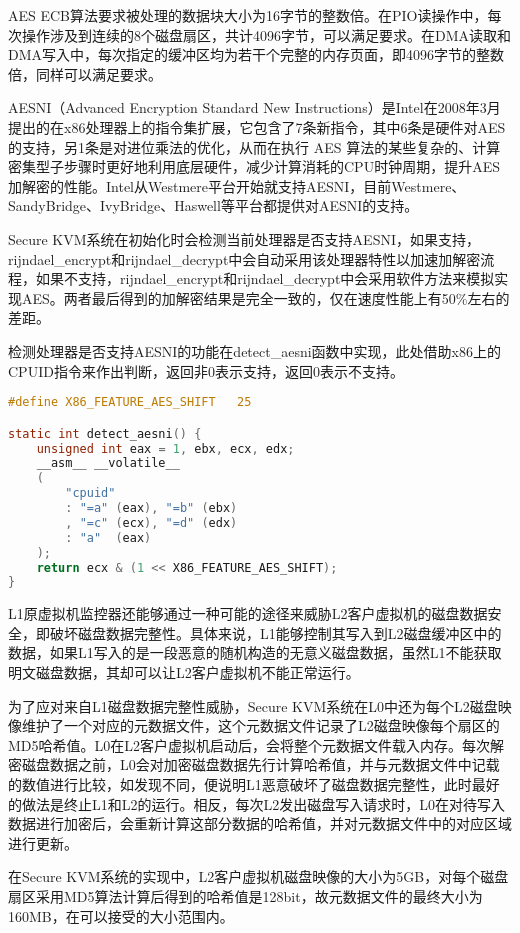 AES ECB算法要求被处理的数据块大小为16字节的整数倍。在PIO读操作中，每次操作涉及到连续的8个磁盘扇区，共计4096字节，可以满足要求。在DMA读取和DMA写入中，每次指定的缓冲区均为若干个完整的内存页面，即4096字节的整数倍，同样可以满足要求。

AESNI（Advanced Encryption Standard New Instructions）是Intel在2008年3月提出的在x86处理器上的指令集扩展，它包含了7条新指令，其中6条是硬件对AES的支持，另1条是对进位乘法的优化，从而在执行 AES 算法的某些复杂的、计算密集型子步骤时更好地利用底层硬件，减少计算消耗的CPU时钟周期，提升AES加解密的性能。Intel从Westmere平台开始就支持AESNI，目前Westmere、SandyBridge、IvyBridge、Haswell等平台都提供对AESNI的支持。

Secure KVM系统在初始化时会检测当前处理器是否支持AESNI，如果支持，rijndael\_encrypt和rijndael\_decrypt中会自动采用该处理器特性以加速加解密流程，如果不支持，rijndael\_encrypt和rijndael\_decrypt中会采用软件方法来模拟实现AES。两者最后得到的加解密结果是完全一致的，仅在速度性能上有50\%左右的差距。

检测处理器是否支持AESNI的功能在detect\_aesni函数中实现，此处借助x86上的CPUID指令来作出判断，返回非0表示支持，返回0表示不支持。

\begin{lstlisting}[language={C}, caption={detect\_aesni实现源代码}]
#define X86_FEATURE_AES_SHIFT	25

static int detect_aesni() {
	unsigned int eax = 1, ebx, ecx, edx;
	__asm__ __volatile__
    (
        "cpuid"
        : "=a" (eax), "=b" (ebx)
        , "=c" (ecx), "=d" (edx)
        : "a"  (eax)
    );
    return ecx & (1 << X86_FEATURE_AES_SHIFT);
}
\end{lstlisting}

L1原虚拟机监控器还能够通过一种可能的途径来威胁L2客户虚拟机的磁盘数据安全，即破坏磁盘数据完整性。具体来说，L1能够控制其写入到L2磁盘缓冲区中的数据，如果L1写入的是一段恶意的随机构造的无意义磁盘数据，虽然L1不能获取明文磁盘数据，其却可以让L2客户虚拟机不能正常运行。

为了应对来自L1磁盘数据完整性威胁，Secure KVM系统在L0中还为每个L2磁盘映像维护了一个对应的元数据文件，这个元数据文件记录了L2磁盘映像每个扇区的MD5哈希值。L0在L2客户虚拟机启动后，会将整个元数据文件载入内存。每次解密磁盘数据之前，L0会对加密磁盘数据先行计算哈希值，并与元数据文件中记载的数值进行比较，如发现不同，便说明L1恶意破坏了磁盘数据完整性，此时最好的做法是终止L1和L2的运行。相反，每次L2发出磁盘写入请求时，L0在对待写入数据进行加密后，会重新计算这部分数据的哈希值，并对元数据文件中的对应区域进行更新。

在Secure KVM系统的实现中，L2客户虚拟机磁盘映像的大小为5GB，对每个磁盘扇区采用MD5算法计算后得到的哈希值是128bit，故元数据文件的最终大小为160MB，在可以接受的大小范围内。

